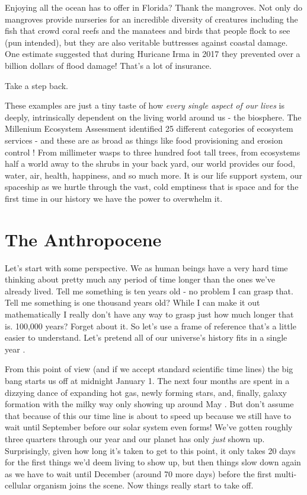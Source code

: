 \documentclass[11pt]{book}
\begin{document}
Enjoying all the ocean has to offer in Florida? Thank the mangroves. Not only do mangroves provide nurseries for an incredible diversity of creatures including the fish that crowd coral reefs and the manatees and birds that people flock to see (pun intended), but they are also veritable buttresses against coastal damage. One estimate suggested that during Huricane Irma in 2017 they prevented over a billion dollars of flood damage! That's a lot of insurance. 
\newline

Take a step back. 
\newline

These examples are just a tiny taste of how \textit{every single aspect of our lives} is deeply, intrinsically dependent on the living world around us - the biosphere. The Millenium Ecosystem Assessment identified 25 different categories of ecosystem services - and these are as broad as things like food provisioning and erosion control \cite{mas}! From millimeter wasps to three hundred foot tall trees, from ecosystems half a world away to the shrubs in your back yard, our world provides our food, water, air, health, happiness, and so much more. It is our life support system, our spaceship as we hurtle through the vast, cold emptiness that is space and for the first time in our history we have the power to overwhelm it. 

\section{The Anthropocene}
Let's start with some perspective. We as human beings have a very hard time thinking about pretty much any period of time longer than the ones we've already lived. Tell me something is ten years old - no problem I can grasp that. Tell me something is one thousand years old? While I can make it out mathematically I really don't have any way to grasp just how much longer that is. 100,000 years? Forget about it. So let's use a frame of reference that's a little easier to understand. Let's pretend all of our universe's history fits in a single year \cite{csagan}. 

From this point of view (and if we accept standard scientific time lines) the big bang starts us off at midnight January 1. The next four months are spent in a dizzying dance of expanding hot gas, newly forming stars, and, finally, galaxy formation with the milky way only showing up around May \cite{eellis}. But don't assume that because of this our time line is about to speed up because we still have to wait until September before our solar system even forms! We've gotten roughly three quarters through our year and our planet has only \textit{just} shown up. Surprisingly, given how long it's taken to get to this point, it only takes 20 days for the first things we'd deem living to show up, but then things slow down again as we have to wait until December (around 70 more days) before the first multi-cellular organism joins the scene. Now things really start to take off. 
\end{document}
